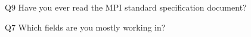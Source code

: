 \begin{description}%
\item{Q9} Have you ever read the MPI standard specification document?%
\item{Q7} Which fields are you mostly working in?%
\end{description}%
